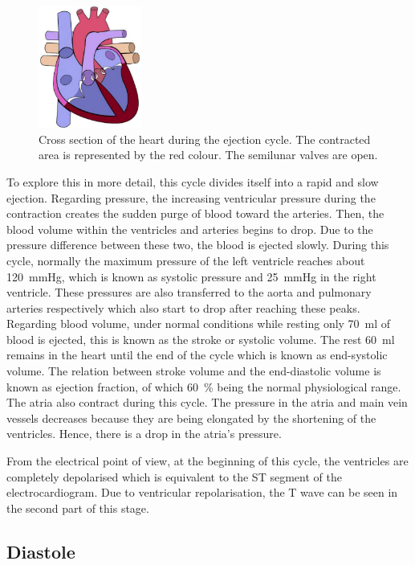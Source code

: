 \begin{figure}[!htpb]
	\centering
	\includegraphics[height=4cm,keepaspectratio]{figure_6}
	\caption[Cross section of the heart during the ejection cycle]{Cross section of the heart during the ejection cycle. The contracted area is represented by the red colour. The semilunar valves are open.}
	\label{fig:heart ejection}
\end{figure}

To explore this in more detail, this cycle divides itself into a rapid and slow ejection. Regarding pressure, the increasing ventricular pressure during the contraction creates the sudden purge of blood toward the arteries. Then, the blood volume within the ventricles and arteries begins to drop. Due to the pressure difference between these two, the blood is ejected slowly. During this cycle, normally the maximum pressure of the left ventricle reaches about \SI{120}{\mmHg}, which is known as systolic pressure and \SI{25}{\mmHg} in the right ventricle. These pressures are also transferred to the aorta and pulmonary arteries respectively which also start to drop after reaching these peaks. Regarding blood volume, under normal conditions while resting only \SI{70}{\milli\litre} of blood is ejected, this is known as the stroke or systolic volume. The rest \SI{60}{\milli\litre} remains in the heart until the end of the cycle which is known as end-systolic volume. The relation between stroke volume and the end-diastolic volume is known as ejection fraction, of which \SI{60}{\percent} being the normal physiological range. The atria also contract during this cycle. The pressure in the atria and main vein vessels decreases because they are being elongated by the shortening of the ventricles. Hence, there is a drop in the atria's pressure. 

From the electrical point of view, at the beginning of this cycle, the ventricles are completely depolarised which is equivalent to the ST segment of the electrocardiogram. Due to ventricular repolarisation, the T wave can be seen in the second part of this stage. 

\subsection{Diastole}
